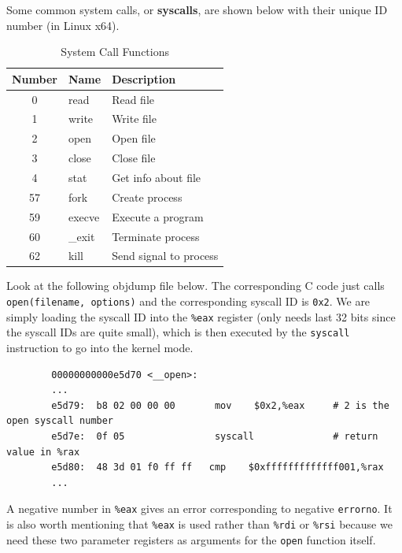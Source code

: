 \documentclass{article}
\begin{document}
    \begin{example}
      Some common system calls, or \textbf{syscalls}, are shown below with their unique ID number (in Linux x64). 
      \begin{table}[H]
        \centering
        \caption{System Call Functions}
        \begin{tabular}{|c|l|l|}
        \hline
        \textbf{Number} & \textbf{Name} & \textbf{Description} \\ \hline
        0 & read & Read file \\ \hline
        1 & write & Write file \\ \hline
        2 & open & Open file \\ \hline
        3 & close & Close file \\ \hline
        4 & stat & Get info about file \\ \hline
        57 & fork & Create process \\ \hline
        59 & execve & Execute a program \\ \hline
        60 & \_exit & Terminate process \\ \hline
        62 & kill & Send signal to process \\ \hline
        \end{tabular}
      \end{table}
    \end{example}

    \begin{example} 
      Look at the following objdump file below. The corresponding C code just calls \texttt{open(filename, options)} and the corresponding syscall ID is \texttt{0x2}. We are simply loading the syscall ID into the \texttt{\%eax} register (only needs last 32 bits since the syscall IDs are quite small), which is then executed by the \texttt{syscall} instruction to go into the kernel mode. 
      \begin{lstlisting}
        00000000000e5d70 <__open>: 
        ...
        e5d79:  b8 02 00 00 00       mov    $0x2,%eax     # 2 is the open syscall number
        e5d7e:  0f 05                syscall              # return value in %rax
        e5d80:  48 3d 01 f0 ff ff   cmp    $0xfffffffffffff001,%rax 
        ... 
      \end{lstlisting}
      A negative number in \texttt{\%eax} gives an error corresponding to negative \texttt{errorno}. It is also worth mentioning that \texttt{\%eax} is used rather than \texttt{\%rdi} or \texttt{\%rsi} because we need these two parameter registers as arguments for the \texttt{open} function itself. 
    \end{example}
\end{document}
